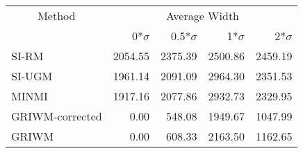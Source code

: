 
\begin{tabular}{lrrrr}
\toprule
\multicolumn{1}{c}{Method} & \multicolumn{4}{c}{Average Width} \\
 & 0*$\sigma$ & 0.5*$\sigma$ & 1*$\sigma$ & 2*$\sigma$\\
\midrule
SI-RM & 2054.55 & 2375.39 & 2500.86 & 2459.19\\
SI-UGM & 1961.14 & 2091.09 & 2964.30 & 2351.53\\
MINMI & 1917.16 & 2077.86 & 2932.73 & 2329.95\\
GRIWM-corrected & 0.00 & 548.08 & 1949.67 & 1047.99\\
GRIWM & 0.00 & 608.33 & 2163.50 & 1162.65\\
\bottomrule
\end{tabular}
